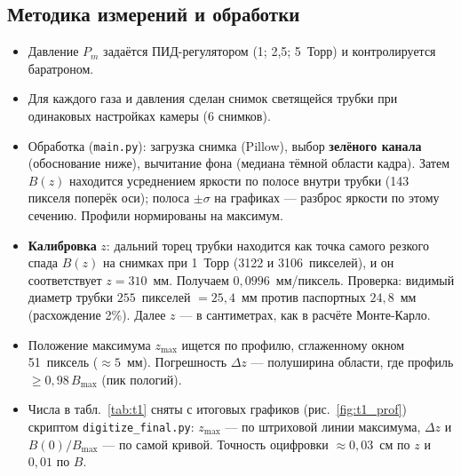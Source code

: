 \documentclass[12pt,a4paper]{article}
\begin{document}
\subsection{Методика измерений и обработки}\label{sec:method1}

\begin{itemize}
  \item Давление $P_m$ задаётся ПИД-регулятором (1; 2,5; 5~Торр) и
        контролируется баратроном.
  \item Для каждого газа и давления сделан снимок светящейся трубки при
        одинаковых настройках камеры (6 снимков).
  \item Обработка (\texttt{main.py}): загрузка снимка (Pillow), выбор
        \textbf{зелёного канала} (обоснование ниже), вычитание фона
        (медиана тёмной области кадра). Затем $B(z)$ находится усреднением яркости
        по полосе внутри трубки (143 пикселя поперёк оси); полоса $\pm\sigma$
        на графиках --- разброс яркости по этому сечению. Профили
        нормированы на максимум.
  \item \textbf{Калибровка} $z$: дальний торец трубки находится как точка
        самого резкого спада $B(z)$ на снимках при 1~Торр (3122 и
        3106~пикселей), и он соответствует $z = 310$~мм. Получаем
        $0{,}0996$~мм/пиксель. Проверка: видимый диаметр трубки
        $255$~пикселей $= 25{,}4$~мм против паспортных $24{,}8$~мм
        (расхождение 2\%). Далее $z$ --- в сантиметрах, как в расчёте
        Монте-Карло.
  \item Положение максимума $z_\text{max}$ ищется по профилю,
        сглаженному окном 51~пиксель ($\approx 5$~мм). Погрешность
        $\Delta z$ --- полуширина области, где профиль $\ge 0{,}98\,B_\text{max}$
        (пик пологий).
  \item Числа в табл.~\ref{tab:t1} сняты с итоговых графиков
        (рис.~\ref{fig:t1_prof}) скриптом \texttt{digitize\_final.py}:
        $z_\text{max}$ --- по штриховой линии максимума, $\Delta z$ и
        $B(0)/B_\text{max}$ --- по самой кривой. Точность оцифровки
        $\approx 0{,}03$~см по $z$ и $0{,}01$ по $B$.
\end{itemize}
\end{document}
